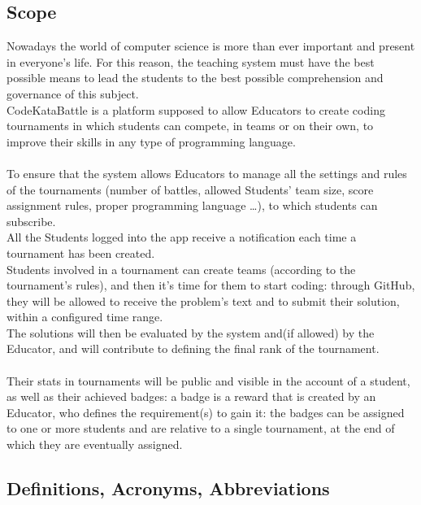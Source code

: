 \documentclass{article}
\begin{document}
\subsection{Scope}
Nowadays the world of computer science is more than ever important and present in everyone's life. For this reason, the teaching system must have the best
possible means to lead the students to the best possible comprehension and governance of this subject. \\
CodeKataBattle is a platform supposed to allow Educators to create coding tournaments in which students can compete, in teams or on their own, to improve their skills in any type of programming language.\\\\
To ensure that the system allows Educators to manage all the settings and rules of the tournaments (number of battles, allowed Students' team size, score assignment rules, proper programming language \dots), to which students can subscribe.\\
All the Students logged into the app receive a notification each time a tournament has been created.\\
Students involved in a tournament can create teams (according to the tournament's rules), and then it's time for them to start coding: through GitHub, they will be allowed to receive the problem's text and to submit their solution, within a configured time range.\\
The solutions will then be evaluated by the system and(if allowed) by the Educator, and will contribute to defining the final rank of the tournament.\\\\
Their stats in tournaments will be public and visible in the account of a student, as well as their achieved badges: a badge is a reward that is created by an Educator, who defines the requirement(s) to gain it: the badges can be assigned to one or more students and are relative to a single tournament, at the end of which they are eventually assigned.

\subsection{Definitions, Acronyms, Abbreviations} 
\end{document}
